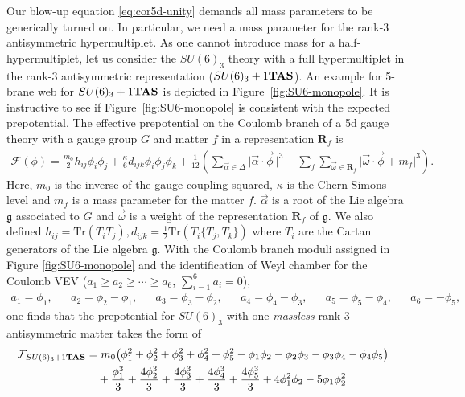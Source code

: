 \documentclass[letterpaper, 11pt]{article}
\def\w{\omega}
\def\D{\Delta}
\begin{document}
{Our blow-up equation \eqref{eq:cor5d-unity} demands all mass parameters to be generically turned on. In particular, we need a mass parameter for the rank-3 antisymmetric hypermultiplet. As one cannot introduce mass for a half-hypermultiplet, let us consider the $SU(6)_3$ theory with a full hypermultiplet in the rank-3 antisymmetric representation ($SU(6)_3+1{\bf TAS}$). 
An example for 5-brane web for $SU(6)_3+1{\bf TAS}$ is depicted in Figure~\ref{fig:SU6-monopole}. It is instructive to see if Figure~\ref{fig:SU6-monopole} is consistent with the expected prepotential.  The effective prepotential on the Coulomb branch of a 5d gauge theory with a gauge group $G$ and matter $f$ in a representation $\mathbf{R}_f$ is \cite{Intriligator:1997pq}
\begin{align}
\mathcal{F}(\phi) = \frac{m_0}{2}h_{ij}\phi_i\phi_j + \frac{\kappa}{6}d_{ijk}\phi_i\phi_j\phi_k + \frac{1}{12}\left(\sum_{\vec{\alpha}\in \D}\Big|\vec{\alpha} \cdot \vec{\phi}\,\Big|^3 - \sum_f\sum_{\vec{\w} \in \mathbf{R}_f}\Big|\vec{\w}\cdot \vec{\phi} + m_f\Big|^3\right). \label{prepotential}
\end{align}
Here, $m_0$ is the inverse of the gauge coupling squared, $\kappa$ is the Chern-Simons level and $m_f$ is a mass parameter for the matter $f$. $\vec{\alpha}$ is a root of the Lie algebra $\mathfrak{g}$ associated to $G$ and $\vec{\w}$ is a weight of the representation $\mathbf{R}_f$ of $\mathfrak{g}$. We also defined $h_{ij} = \text{Tr}(T_iT_j), d_{ijk} = \frac{1}{2}\text{Tr}\left(T_i\{T_j, T_k\}\right)$ where $T_i$ are the Cartan generators of the Lie algebra $\mathfrak{g}$. With the Coulomb branch moduli assigned in Figure \ref{fig:SU6-monopole} and the identification of Weyl chamber for the Coulomb VEV ($a_1\ge a_2\ge \cdots \ge a_{6}$, $\sum_{i=1}^{6}a_i=0$),
\begin{align}
	a_1= \phi_1,&& 
	a_2=\phi_2-\phi_1,&&
	a_3=\phi_3-\phi_2,&&
	a_4=\phi_4-\phi_3,&&
	a_5=\phi_5-\phi_4,&&
	a_6=-\phi_5, \label{orth2Dynkin}
\end{align}
one finds that the prepotential for $SU(6)_3$ with one \emph{massless} rank-3 antisymmetric matter takes the form of
\begin{align}
\begin{split}
	\mathcal{F}_{SU(6)_3+1{\bf TAS}} &= m_0 \big( \phi _1^2+\phi _2^2+\phi _3^2+\phi _4^2+\phi _5^2-\phi _1 \phi _2-\phi _2 \phi _3-\phi _3 \phi _4-\phi _4
   \phi _5\big) \cr
   &\quad + \frac{\phi _1^3}{3}+\frac{4 \phi _2^3}{3}+\frac{4
   \phi _3^3}{3}+\frac{4 \phi_4^3}{3}+\frac{4 \phi_5^3}{3}+4\phi_1^2 \phi_2 -5 \phi_1\phi_2^2  \cr

\end{split}
\end{align}}
\end{document}
